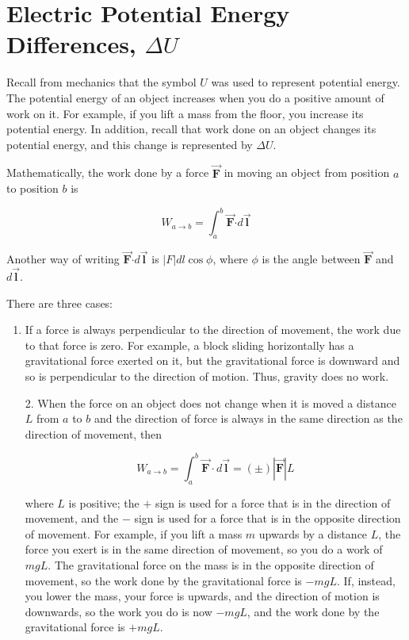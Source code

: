 \documentclass{article}
\newcommand{\bfvec}[1]{\vec{\mathbf{#1}}}
\newcommand{\bfcdot}[0]{\boldsymbol{\cdot}}
\begin{document}
\section{Electric Potential Energy Differences, $\Delta U$}

Recall from mechanics that the symbol $U$ was used to represent potential energy. The potential energy of an object increases when you do a positive amount of work on it. For example, if you lift a mass from the floor, you increase its potential energy. In addition, recall that work done on an object changes its potential energy, and this change is represented by $\Delta U$.

Mathematically, the work done by a force $\bfvec{F}$ in moving an object from position $a$ to position $b$ is

\begin{equation}
W_{a\rightarrow b}=\int_a^b \bfvec{F}\bfcdot d\bfvec{l}
\end{equation}

Another way of writing $\bfvec{F}\bfcdot d\bfvec{l}$ is $|F|dl\cos\phi$, where $\phi$ is the angle between $\bfvec{F}$ and $d{\bfvec l}$.

There are three cases:

\begin{enumerate}

  \item If a force is always perpendicular to the direction of movement, the work due to that force is zero. For example, a block sliding horizontally has a gravitational force exerted on it, but the gravitational force is downward and so is perpendicular to the direction of motion. Thus, gravity does no work.

\end{enumerate}

\begin{enumerate}

  \item[2.] When the force on an object does not change when it is moved a distance $L$ from $a$ to $b$ and the direction of force is always in the same direction as the direction of movement, then

            \begin{equation}
            W_{a\rightarrow b}=\int_a^b \bfvec{F}\cdot d\bfvec{l}=(\pm)|\bfvec{F}|L
            \end{equation}

            where $L$ is positive; the $+$ sign is used for a force that is in the direction of movement, and the $-$ sign is used for a force that is in the opposite direction of movement. For example, if you lift a mass $m$ upwards by a distance $L$, the force you exert is in the same direction of movement, so you do a work of $mgL$. The gravitational force on the mass is in the opposite direction of movement, so the work done by the gravitational force is $-mgL$. If, instead, you lower the mass, your force is upwards, and the direction of motion is downwards, so the work you do is now $-mgL$, and the work done by the gravitational force is $+mgL$.

\end{enumerate}
\end{document}
